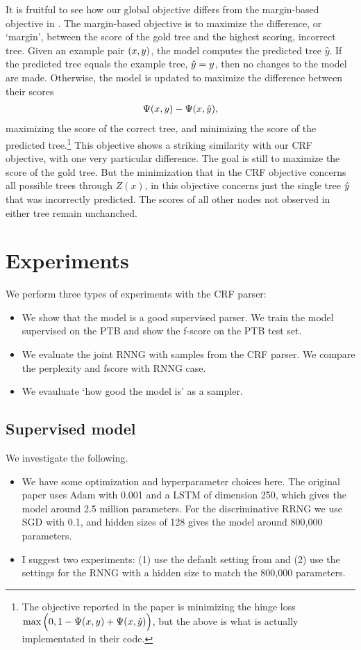   It is fruitful to see how our global objective differs from the margin-based objective in \citep{stern2017minimal}. The margin-based objective is to maximize the difference, or `margin', between the score of the gold tree and the highest scoring, incorrect tree. Given an example pair $(x, y)$, the model computes the predicted tree $\hat{y}$. If the predicted tree equals the example tree, $\hat{y} = y$, then no changes to the model are made. Otherwise, the model is updated to maximize the difference between their scores
  \begin{align*}
    \Psi(x, y) - \Psi(x, \hat{y}),
  \end{align*}
  maximizing the score of the correct tree, and minimizing the score of the predicted tree.\footnote{The objective reported in the paper is minimizing the hinge loss $\max \Big(0, 1 - \Psi(x, y) + \Psi(x, \hat{y}) \Big)$, but the above is what is actually implementated in their code.} This objective shows a striking similarity with our CRF objective, with one very particular difference. The goal is still to maximize the score of the gold tree. But the minimization that in the CRF objective concerns all possible trees through $Z(x)$, in this objective concerns just the single tree $\hat{y}$ that was incorrectly predicted. The scores of all other nodes not observed in either tree remain unchanched.

\section{Experiments}
  We perform three types of experiments with the CRF parser:
  \begin{itemize}
    \item We show that the model is a good supervised parser. We train the model supervised on the PTB and show the f-score on the PTB test set.
    \item We evaluate the joint RNNG with samples from the CRF parser. We compare the perplexity and fscore with RNNG case.
    \item We evauluate `how good the model is' as a sampler.
  \end{itemize}

\subsection{Supervised model}
  We investigate the following.
  \begin{itemize}
    \item We have some optimization and hyperparameter choices here. The original paper uses Adam with 0.001 and a LSTM of dimension 250, which gives the model around 2.5 million parameters. For the discriminative RRNG we use SGD with 0.1, and hidden sizes of 128 gives the model around 800,000 parameters.
    \item I suggest two experiments: (1) use the default setting from \citep{stern2017minimal} and (2) use the settings for the RNNG with a hidden size to match the 800,000 parameters.
  \end{itemize}

